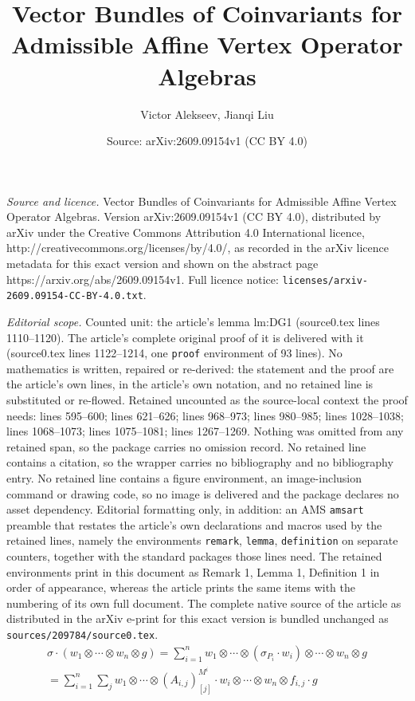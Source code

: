 \documentclass[10pt,a4paper]{amsart}
\title{Vector Bundles of Coinvariants for Admissible Affine Vertex Operator Algebras}
\author{Victor Alekseev, Jianqi Liu}
\date{Source: arXiv:2609.09154v1 (CC BY 4.0)}
\begin{document}
\maketitle

\noindent\emph{Source and licence.} Vector Bundles of Coinvariants for Admissible Affine Vertex Operator Algebras. Version arXiv:2609.09154v1 (CC BY 4.0), distributed by arXiv under the Creative Commons Attribution 4.0 International licence, http://creativecommons.org/licenses/by/4.0/, as recorded in the arXiv licence metadata for this exact version and shown on the abstract page https://arxiv.org/abs/2609.09154v1. Full licence notice: \texttt{licenses/arxiv-2609.09154-CC-BY-4.0.txt}.\par\smallskip

\noindent\textit{Editorial scope.} Counted unit: the article's lemma lm:DG1 (source0.tex lines 1110--1120). The article's complete original proof of it is delivered with it (source0.tex lines 1122--1214, one \texttt{proof} environment of 93 lines). No mathematics is written, repaired or re-derived: the statement and the proof are the article's own lines, in the article's own notation, and no retained line is substituted or re-flowed.  Retained uncounted as the source-local context the proof needs: lines 595--600; lines 621--626; lines 968--973; lines 980--985; lines 1028--1038; lines 1068--1073; lines 1075--1081; lines 1267--1269.  Nothing was omitted from any retained span, so the package carries no omission record.  No retained line contains a citation, so the wrapper carries no bibliography and no bibliography entry.  No retained line contains a figure environment, an image-inclusion command or drawing code, so no image is delivered and the package declares no asset dependency.  Editorial formatting only, in addition: an AMS \texttt{amsart} preamble that restates the article's own declarations and macros used by the retained lines, namely the environments \texttt{remark}, \texttt{lemma}, \texttt{definition} on separate counters, together with the standard packages those lines need.  The retained environments print in this document as Remark 1, Lemma 1, Definition 1 in order of appearance, whereas the article prints the same items with the numbering of its own full document.  The complete native source of the article as distributed in the arXiv e-print for this exact version is bundled unchanged as \texttt{sources/209784/source0.tex}.
\begin{equation}\label{chiralLieact}
\begin{split}
    \sigma \cdot (w_1 \otimes\cdots\otimes w_n \otimes g) = \sum_{i=1}^n w_1 \otimes\cdots\otimes (\sigma_{P_i} \cdot w_i) \otimes\cdots\otimes w_n \otimes g \\
    = \sum_{i=1}^n \sum_{j} w_1 \otimes\cdots\otimes \left(A_{i,j}\right)^{M^i}_{[j]}\cdot w_i \otimes\cdots\otimes w_n \otimes f_{i,j}\cdot g
\end{split}
\end{equation}
\end{document}
